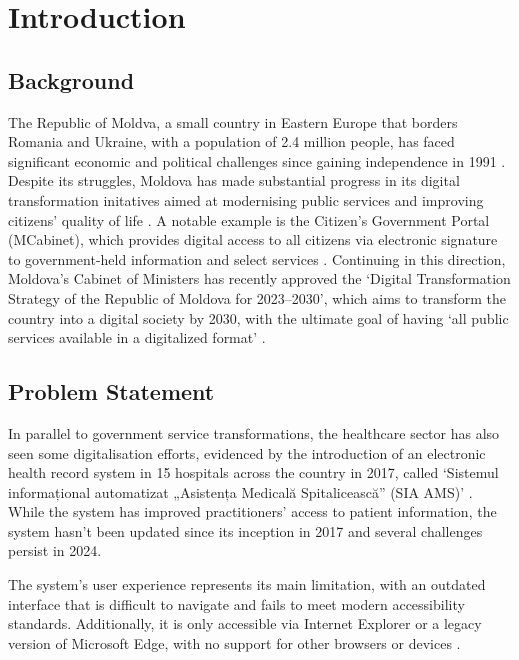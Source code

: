 \chapter{Introduction}\label{chap:introduction}

\section{Background}

The Republic of Moldva, a small country in Eastern Europe that borders Romania and Ukraine, with a population of 2.4 million people, has faced significant economic and political challenges since gaining independence in 1991 \parencite{mdpop, mdpoverty}. Despite its struggles, Moldova has made substantial progress in its digital transformation initatives aimed at modernising public services and improving citizens' quality of life \parencite{mdega}. A notable example is the Citizen's Government Portal (MCabinet), which provides digital access to all citizens via electronic signature to government-held information and select services \parencite{mdcabinet}. Continuing in this direction, Moldova's Cabinet of Ministers has recently approved the `Digital Transformation Strategy of the Republic of Moldova for 2023--2030', which aims to transform the country into a digital society by 2030, with the ultimate goal of having `all public services available in a digitalized format' \parencite{mdstrategy}.

\section{Problem Statement}

In parallel to government service transformations, the healthcare sector has also seen some digitalisation efforts, evidenced by the introduction of an electronic health record system in 15 hospitals across the country in 2017, called `Sistemul informațional automatizat „Asistența Medicală Spitalicească” (SIA AMS)' \parencite{mdehr}. While the system has improved practitioners' access to patient information, the system hasn't been updated since its inception in 2017 and several challenges persist in 2024.

The system's user experience represents its main limitation, with an outdated interface that is difficult to navigate and fails to meet modern accessibility standards. Additionally, it is only accessible via Internet Explorer or a legacy version of Microsoft Edge, with no support for other browsers or devices \parencite{mdehr}.

